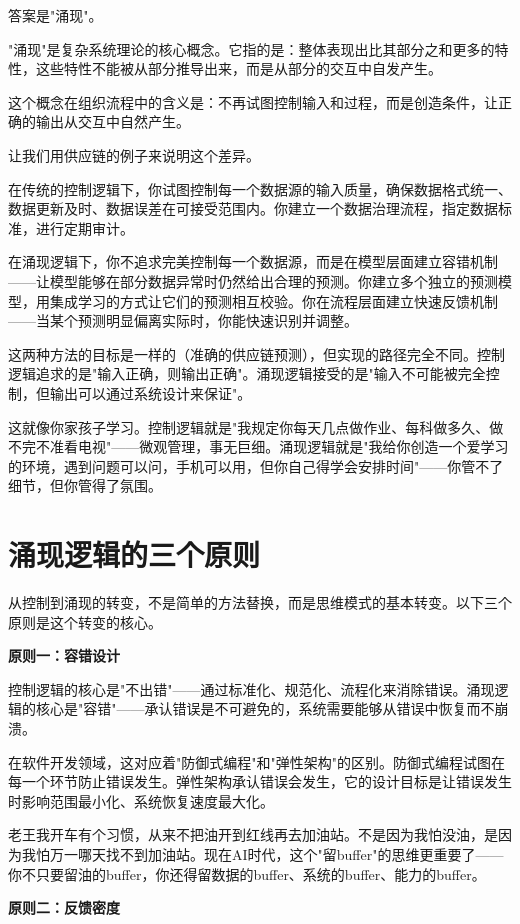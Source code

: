 答案是"涌现"。

"涌现"是复杂系统理论的核心概念。它指的是：整体表现出比其部分之和更多的特性，这些特性不能被从部分推导出来，而是从部分的交互中自发产生。

这个概念在组织流程中的含义是：不再试图控制输入和过程，而是创造条件，让正确的输出从交互中自然产生。

让我们用供应链的例子来说明这个差异。

在传统的控制逻辑下，你试图控制每一个数据源的输入质量，确保数据格式统一、数据更新及时、数据误差在可接受范围内。你建立一个数据治理流程，指定数据标准，进行定期审计。

在涌现逻辑下，你不追求完美控制每一个数据源，而是在模型层面建立容错机制——让模型能够在部分数据异常时仍然给出合理的预测。你建立多个独立的预测模型，用集成学习的方式让它们的预测相互校验。你在流程层面建立快速反馈机制——当某个预测明显偏离实际时，你能快速识别并调整。

这两种方法的目标是一样的（准确的供应链预测），但实现的路径完全不同。控制逻辑追求的是"输入正确，则输出正确"。涌现逻辑接受的是"输入不可能被完全控制，但输出可以通过系统设计来保证"。

这就像你家孩子学习。控制逻辑就是"我规定你每天几点做作业、每科做多久、做不完不准看电视"——微观管理，事无巨细。涌现逻辑就是"我给你创造一个爱学习的环境，遇到问题可以问，手机可以用，但你自己得学会安排时间"——你管不了细节，但你管得了氛围。

\section{涌现逻辑的三个原则}


从控制到涌现的转变，不是简单的方法替换，而是思维模式的基本转变。以下三个原则是这个转变的核心。

\textbf{原则一：容错设计}

控制逻辑的核心是"不出错"——通过标准化、规范化、流程化来消除错误。涌现逻辑的核心是"容错"——承认错误是不可避免的，系统需要能够从错误中恢复而不崩溃。

在软件开发领域，这对应着"防御式编程"和"弹性架构"的区别。防御式编程试图在每一个环节防止错误发生。弹性架构承认错误会发生，它的设计目标是让错误发生时影响范围最小化、系统恢复速度最大化。

老王我开车有个习惯，从来不把油开到红线再去加油站。不是因为我怕没油，是因为我怕万一哪天找不到加油站。现在AI时代，这个"留buffer"的思维更重要了——你不只要留油的buffer，你还得留数据的buffer、系统的buffer、能力的buffer。

\textbf{原则二：反馈密度}

